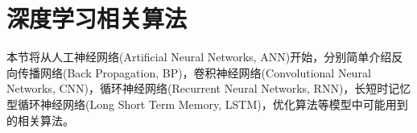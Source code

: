\begin{center}
\begin{figure}
\end{figure}
\end{center}

\section{深度学习相关算法}
本节将从人工神经网络(Artificial Neural Networks, ANN)开始，分别简单介绍反向传播网络(Back Propagation, BP)，卷积神经网络(Convolutional Neural Networks, CNN)，循环神经网络(Recurrent Neural Networks, RNN)，长短时记忆型循环神经网络(Long Short Term Memory, LSTM)，优化算法等模型中可能用到的相关算法。
